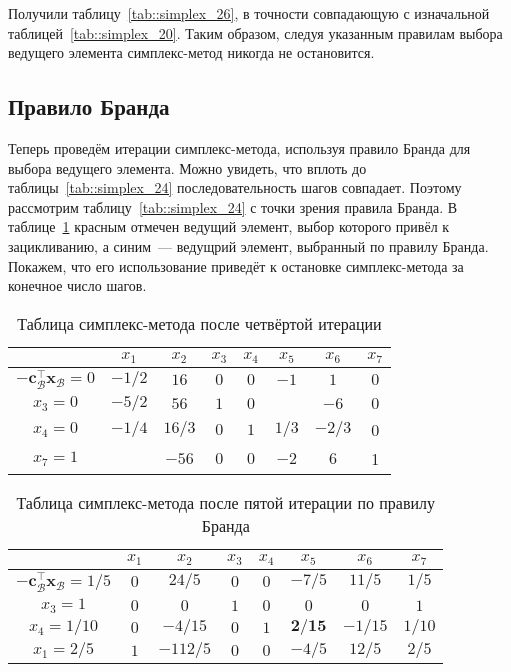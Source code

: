 \documentclass[12pt]{article}
\newcommand{\bx}{\mathbf{x}}
\begin{document}
Получили таблицу~\ref{tab::simplex_26}, в точности совпадающую с изначальной таблицей~\ref{tab::simplex_20}. 
Таким образом, следуя указанным правилам выбора ведущего элемента симплекс-метод никогда не остановится.

\subsection{Правило Бранда}

Теперь проведём итерации симплекс-метода, используя правило Бранда для выбора ведущего элемента.
Можно увидеть, что вплоть до таблицы~\ref{tab::simplex_24} последовательность шагов совпадает.
Поэтому рассмотрим таблицу~\ref{tab::simplex_24} с точки зрения правила Бранда.
В таблице~\ref{tab::simplex_24_2} красным отмечен ведущий элемент, выбор которого привёл к зацикливанию, а синим~--- ведущрий элемент, выбранный по правилу Бранда.
Покажем, что его использование приведёт к остановке симплекс-метода за конечное число шагов.

\begin{table}[!ht]
\centering
\caption{Таблица симплекс-метода после четвёртой итерации}
\begin{tabular}{|c|ccccccc|}
\hline
& $x_1$ & $x_2$ & $x_3$ & $x_4$ & $x_5$ & $x_6$ & $x_7$\\
\hline
$-\mathbf{c}_{\mathcal{B}}^{\top}\bx_{\mathcal{B}} = 0$ & $-1/2$ & $16$ & $0$ & $0$ & $-1$ & $1$ & $0$ \\
\hline
$x_3 = 0$ & $-5/2$ & $56$ & $1$ & $0$ & {\color{red}{$\mathbf{2}$}} & $-6$ & $0$ \\
$x_4 = 0$ & $-1/4$ & $16/3$ & $0$ & $1$ & $1/3$ & $-2/3$ & 0 \\
$x_7 = 1$ & {\color{blue}{$\mathbf{5/2}$}} & $-56$ & $0$ & $0$ & $-2$ & $6$ & 1 \\
\hline
\end{tabular}
\label{tab::simplex_24_2}
\end{table}

\begin{table}[!ht]
\centering
\caption{Таблица симплекс-метода после пятой итерации по правилу Бранда}
\begin{tabular}{|c|ccccccc|}
\hline
& $x_1$ & $x_2$ & $x_3$ & $x_4$ & $x_5$ & $x_6$ & $x_7$\\
\hline
$-\mathbf{c}_{\mathcal{B}}^{\top}\bx_{\mathcal{B}} = 1/5$ & $0$ & $24/5$ & $0$ & $0$ & $-7/5$ & $11/5$ & $1/5$ \\
\hline
$x_3 = 1$ & $0$ & $0$ & $1$ & $0$ & $0$ & $0$ & $1$ \\
$x_4 = 1/10$ & $0$ & $-4/15$ & $0$ & $1$ & $\mathbf{2/15}$ & $-1/15$ & $1/10$ \\
$x_1 = 2/5$ & $1$ & $-112/5$ & $0$ & $0$ & $-4/5$ & $12/5$ & $2/5$ \\
\hline
\end{tabular}
\label{tab::simplex_25_2}
\end{table}
\end{document}
